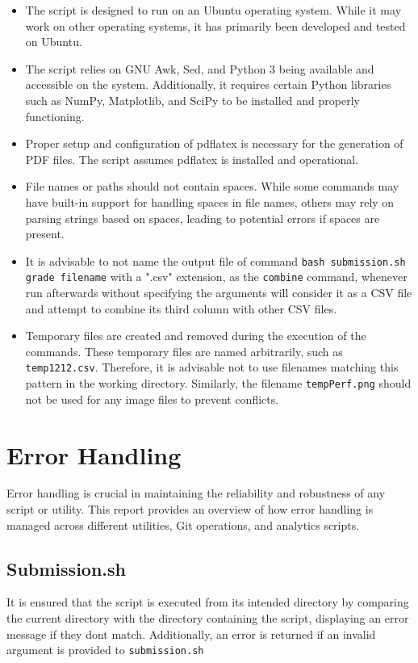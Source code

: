 \documentclass{article}
\begin{document}
\begin{itemize}
\item The script is designed to run on an Ubuntu operating system. While it may work on other operating systems, it has primarily been developed and tested on Ubuntu.
\item The script relies on GNU Awk, Sed, and Python 3 being available and accessible on the system. Additionally, it requires certain Python libraries such as NumPy, Matplotlib, and SciPy to be installed and properly functioning.

\item Proper setup and configuration of pdflatex is necessary for the generation of PDF files. The script assumes pdflatex is installed and operational.

\item File names or paths should not contain spaces. While some commands may have built-in support for handling spaces in file names, others may rely on parsing strings based on spaces, leading to potential errors if spaces are present.

\item It is advisable to not name the output file of command \texttt{bash submission.sh grade filename} with a ".csv" extension, as the \texttt{combine} command, whenever run afterwards without specifying the arguments will consider it as a CSV file and attempt to combine its third column with other CSV files. 

\item Temporary files are created and removed during the execution of the commands. These temporary files are named arbitrarily, such as \texttt{temp1212.csv}. Therefore, it is advisable not to use filenames matching this pattern in the working directory. Similarly, the filename \texttt{tempPerf.png} should not be used for any image files to prevent conflicts.
\end{itemize}

\section{Error Handling}

Error handling is crucial in maintaining the reliability and robustness of any script or utility. This report provides an overview of how error handling is managed across different utilities, Git operations, and analytics scripts.

\subsection{Submission.sh}
It is ensured that the script is executed from its intended directory by comparing the current directory with the directory containing the script, displaying an error message if they dont match. Additionally, an error is returned if an invalid argument is provided to \texttt{submission.sh}
\end{document}
